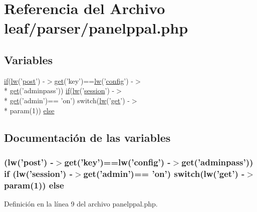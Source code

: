\hypertarget{panelppal_8php}{\section{Referencia del Archivo leaf/parser/panelppal.php}
\label{panelppal_8php}
}
\subsection*{Variables}
\begin{DoxyCompactItemize}
\item 
\hyperlink{index_8php_a03ed0eadab502a2cb754ef4963570e97}{if}(\hyperlink{classlw}{lw}('\hyperlink{classpost}{post}') -\/$>$\hyperlink{classget}{get}('key')==\hyperlink{classlw}{lw}('\hyperlink{classconfig}{config}') -\/$>$\\*
\hyperlink{classget}{get}('adminpass')) \hyperlink{index_8php_a03ed0eadab502a2cb754ef4963570e97}{if}(\hyperlink{classlw}{lw}('\hyperlink{classsession}{session}') -\/$>$\\*
\hyperlink{classget}{get}('admin')== 'on') switch(\hyperlink{classlw}{lw}('\hyperlink{classget}{get}') -\/$>$\\*
 param(1)) \hyperlink{panelppal_8php_a82003376ae11fb3ccbf9d3cf3a4769a0}{else}
\end{DoxyCompactItemize}


\subsection{Documentación de las variables}
\hypertarget{panelppal_8php_a82003376ae11fb3ccbf9d3cf3a4769a0}{
\subsubsection[{else}]{ ({\bf lw}('{\bf post}') -\/$>${\bf get}('key')=={\bf lw}('{\bf config}') -\/$>${\bf get}('adminpass')) {\bf if} ({\bf lw}('{\bf session}') -\/$>${\bf get}('admin')== 'on') switch({\bf lw}('{\bf get}') -\/$>$ param(1)) else}}\label{panelppal_8php_a82003376ae11fb3ccbf9d3cf3a4769a0}


Definición en la línea 9 del archivo panelppal.\-php.


